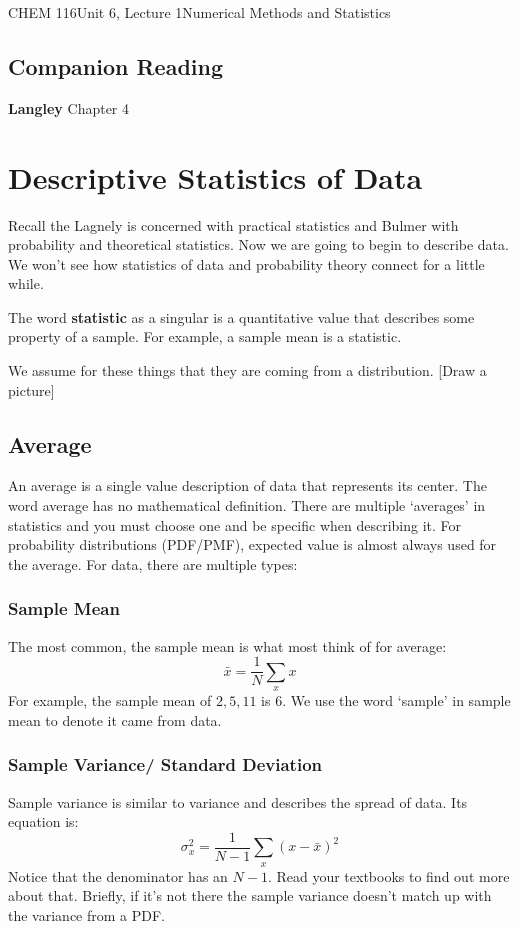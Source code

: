 \documentclass{article}
\begin{document}
\begin{tdoc}{CHEM 116}{Unit 6, Lecture 1}{Numerical Methods and Statistics}

  \subsection*{Companion Reading}
  \textbf{Langley} Chapter 4


\section{Descriptive Statistics of Data}
Recall the Lagnely is concerned with practical statistics and Bulmer
with probability and theoretical statistics. Now we are going to begin
to describe data. We won't see how statistics of data and probability
theory connect for a little while.

The word {\bf statistic} as a singular is a quantitative value that
describes some property of a sample. For example, a sample mean is a
statistic.

We assume for these things that they are coming from a
distribution. [Draw a picture]

\subsection{Average}
An average is a single value description of data that represents its
center. The word average has no mathematical definition. There are
multiple `averages' in statistics and you must choose one and be
specific when describing it. For probability distributions (PDF/PMF),
expected value is almost always used for the average. For data, there
are multiple types:

\subsubsection{Sample Mean}
The most common, the sample mean is what most think of for average:
\begin{equation}
\bar{x} = \frac{1}{N}\sum_x x
\end{equation}
For example, the sample mean of $2,5,11$ is 6. We use the word
`sample' in sample mean to denote it came from data.

\subsubsection{Sample Variance/ Standard Deviation}
Sample variance is similar to variance and describes the spread of
data. Its equation is:
\begin{equation}
\sigma_x^2 = \frac{1}{N - 1} \sum_x (x - \bar{x})^2
\end{equation}
Notice that the denominator has an $N - 1$. Read your textbooks to
find out more about that. Briefly, if it's not there the sample
variance doesn't match up with the variance from a PDF.


\end{tdoc}
\end{document}
